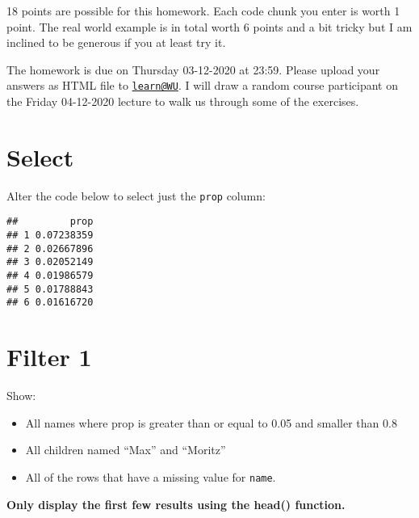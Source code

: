 \documentclass[
]{article}
\newenvironment{Shaded}{\begin{snugshade}}{\end{snugshade}}
\newcommand{\FloatTok}[1]{\textcolor[rgb]{0.00,0.00,0.81}{#1}}
\newcommand{\KeywordTok}[1]{\textcolor[rgb]{0.13,0.29,0.53}{\textbf{#1}}}
\newcommand{\NormalTok}[1]{#1}
\newcommand{\OperatorTok}[1]{\textcolor[rgb]{0.81,0.36,0.00}{\textbf{#1}}}
\newcommand{\StringTok}[1]{\textcolor[rgb]{0.31,0.60,0.02}{#1}}
\providecommand{\tightlist}{%
  \setlength{\itemsep}{0pt}\setlength{\parskip}{0pt}}
\begin{document}
18 points are possible for this homework. Each code chunk you enter is
worth 1 point. The real world example is in total worth 6 points and a
bit tricky but I am inclined to be generous if you at least try it.

The homework is due on Thursday 03-12-2020 at 23:59. Please upload your
answers as HTML file to \href{mailto:learn@WU}{\nolinkurl{learn@WU}}. I
will draw a random course participant on the Friday 04-12-2020 lecture
to walk us through some of the exercises.

\hypertarget{select}{%
\section{Select}\label{select}}

Alter the code below to select just the \texttt{prop} column:

\begin{Shaded}
\end{Shaded}

\begin{verbatim}
##         prop
## 1 0.07238359
## 2 0.02667896
## 3 0.02052149
## 4 0.01986579
## 5 0.01788843
## 6 0.01616720
\end{verbatim}

\hypertarget{filter-1}{%
\section{Filter 1}\label{filter-1}}

Show:

\begin{itemize}
\tightlist
\item
  All names where prop is greater than or equal to 0.05 and smaller than
  0.8
\item
  All children named ``Max'' and ``Moritz''
\item
  All of the rows that have a missing value for \texttt{name}.
\end{itemize}

\textbf{Only display the first few results using the head() function.}

\begin{Shaded}
\end{Shaded}
\end{document}
